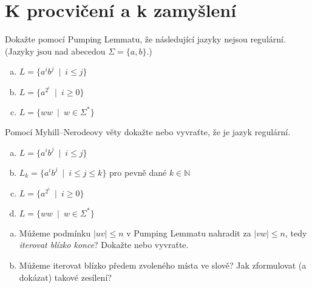 \documentclass[a4paper,12pt]{amsart}
\begin{document}
\section*{K procvičení a k zamyšlení}


\medskip\begin{problem}
    
    Dokažte pomocí Pumping Lemmatu, že následující jazyky nejsou regulární. (Jazyky jsou nad abecedou $\Sigma=\{a,b\}$.)
    
    \medskip
      
    \begin{enumerate}[(a)]\setlength\itemsep{6pt}
        \item $L=\{a^ib^j\ \mid\ i\leq j\}$        
        \item $L=\{a^{2^i}\ \mid\ i\geq 0\}$
        \item $L=\{ww\ \mid \ w\in\Sigma^*\}$
    \end{enumerate}
      
\end{problem}


\medskip\begin{problem}

    Pomocí Myhill--Nerodeovy věty dokažte nebo vyvraťte, že je jazyk regulární.
    \begin{enumerate}[(a)]\setlength\itemsep{6pt}
        \item $L=\{a^ib^j\ \mid\ i\leq j\}$
        \item $L_k=\{a^ib^j\ \mid\ i\leq j\leq k\}$ pro pevně dané $k\in\mathbb N$
        \item $L=\{a^{2^i}\ \mid\ i\geq 0\}$
        \item $L=\{ww\ \mid \ w\in\Sigma^*\}$
    \end{enumerate}

\end{problem}


\medskip\begin{problem}

    \begin{enumerate}[(a)]\setlength\itemsep{6pt}
        \item Můžeme podmínku $|uv|\leq n$ v Pumping Lemmatu nahradit za $|vw|\leq n$, tedy \emph{iterovat blízko konce}? Dokažte nebo vyvraťte.
        \item Můžeme iterovat blízko předem zvoleného místa ve slově? Jak zformulovat (a dokázat) takové zesílení?
    \end{enumerate}

\end{problem}
\end{document}
